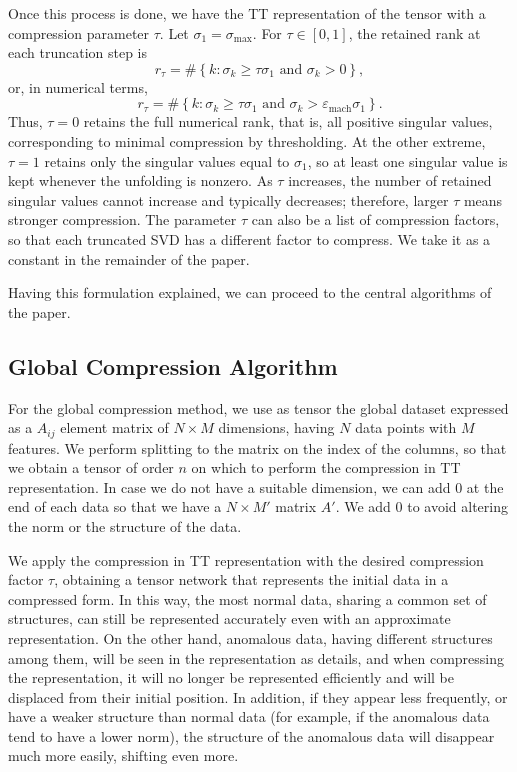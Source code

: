 \documentclass{article}
\begin{document}
Once this process is done, we have the TT representation of the tensor with a compression parameter $\tau$. Let $\sigma_1=\sigma_{\max}$. For $\tau\in[0,1]$, the retained rank at each truncation step is
\begin{equation}
    r_\tau=\#\left\{k:\sigma_k\geq\tau\sigma_1\text{ and }\sigma_k>0\right\},
\end{equation}
or, in numerical terms,
\begin{equation}
    r_\tau=\#\left\{k:\sigma_k\geq\tau\sigma_1\text{ and }\sigma_k>\varepsilon_{\mathrm{mach}}\sigma_1\right\}.
\end{equation}
Thus, $\tau=0$ retains the full numerical rank, that is, all positive singular values, corresponding to minimal compression by thresholding. At the other extreme, $\tau=1$ retains only the singular values equal to $\sigma_1$, so at least one singular value is kept whenever the unfolding is nonzero. As $\tau$ increases, the number of retained singular values cannot increase and typically decreases; therefore, larger $\tau$ means stronger compression. The parameter $\tau$ can also be a list of compression factors, so that each truncated SVD has a different factor to compress. We take it as a constant in the remainder of the paper.

Having this formulation explained, we can proceed to the central algorithms of the paper.

\subsection{Global Compression Algorithm}
For the global compression method, we use as tensor the global dataset expressed as a $A_{ij}$ element matrix of $N\times M$ dimensions, having $N$ data points with $M$ features. We perform splitting to the matrix on the index of the columns, so that we obtain a tensor of order $n$ on which to perform the compression in TT representation. In case we do not have a suitable dimension, we can add 0 at the end of each data so that we have a $N\times M'$ matrix $A'$. We add 0 to avoid altering the norm or the structure of the data.

We apply the compression in TT representation with the desired compression factor $\tau$, obtaining a tensor network that represents the initial data in a compressed form. In this way, the most normal data, sharing a common set of structures, can still be represented accurately even with an approximate representation. On the other hand, anomalous data, having different structures among them, will be seen in the representation as details, and when compressing the representation, it will no longer be represented efficiently and will be displaced from their initial position. In addition, if they appear less frequently, or have a weaker structure than normal data (for example, if the anomalous data tend to have a lower norm), the structure of the anomalous data will disappear much more easily, shifting even more. 
\end{document}
